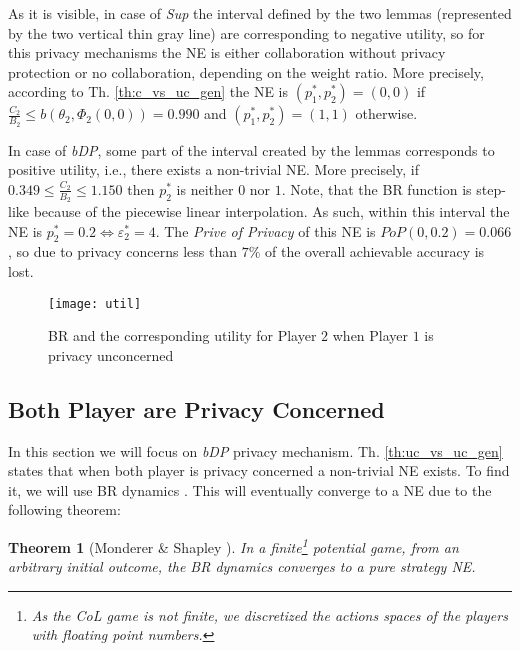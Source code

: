 \documentclass[USenglish,oneside,twocolumn]{article}
\theoremstyle{plain}
\newtheorem*{theorem*}{Theorem}
\begin{document}
    As it is visible, in case of \textit{Sup} the interval defined by the two lemmas (represented by the two vertical thin gray line) are corresponding to negative utility, so for this privacy mechanisms the NE is either collaboration without privacy protection or no collaboration, depending on the weight ratio. More precisely, according to Th. \ref{th:c_vs_uc_gen} the NE is $(p_1^*,p_2^*)=(0,0)$ if $\frac{C_2}{B_2}\leq b(\theta_2,\Phi_2(0,0))=\num{0.990}$ and $(p_1^*,p_2^*)=(1,1)$ otherwise. %
    
    In case of \textit{bDP}, some part of the interval created by the lemmas corresponds to positive utility, i.e., there exists a non-trivial NE. More precisely, if $\num{0.349}\leq\frac{C_2}{B_2}\leq\num{1.150}$ then $p_2^*$ is neither $0$ nor $1$. Note, that the BR function is step-like because of the piecewise linear interpolation. As such, within this interval the NE is $p_2^*=0.2\Leftrightarrow\varepsilon_2^*=4$. The \textit{Prive of Privacy} of this NE is $PoP(0,0.2)=\num{0.066}$, so due to privacy concerns less than $7\%$ of the overall achievable accuracy is lost. 
    
    \vspace{-0.25cm}
    \begin{figure}[h]
        \centering
        \texttt{[image: util]}
        \caption{BR and the corresponding utility for Player $2$ when Player $1$ is privacy unconcerned}
        \label{fig:utility}
    \end{figure}
    \vspace{-1cm}
    \subsection{Both Player are Privacy Concerned}
    \vspace{-0.25cm}
    
    In this section we will focus on \textit{bDP} privacy mechanism. Th. \ref{th:uc_vs_uc_gen} states that when both player is privacy concerned a non-trivial NE exists. To find it, we will use BR dynamics \cite{harsanyi1988general}. This will eventually converge to a NE due to the following theorem:
    
    \vspace{-0.25cm}
    \begin{theorem*}[Monderer \& Shapley \cite{monderer1996potential}]
        In a finite\footnote{As the CoL game is not finite, we discretized the actions spaces of the players with floating point numbers.} potential game, from an arbitrary initial outcome, the BR dynamics converges to a pure strategy NE.
    \end{theorem*}
    \vspace{-0.25cm}
    
\end{document}

